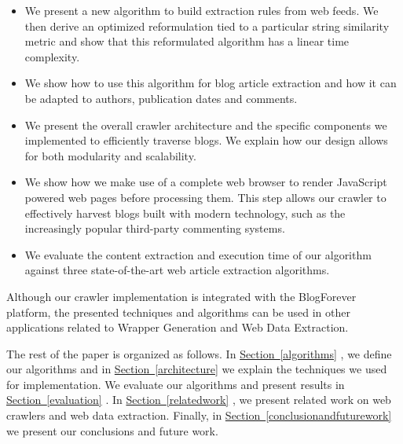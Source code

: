 \begin{itemize}
  \item We present a new algorithm to build extraction rules from web feeds. We then derive an optimized reformulation tied to a particular string similarity metric and show that this reformulated algorithm has a linear time complexity.
  \item We show how to use this algorithm for blog article extraction and how it can be adapted to authors, publication dates and comments.
  \item We present the overall crawler architecture and the specific components we implemented to efficiently traverse blogs. We explain how our design allows for both modularity and scalability.
  \item We show how we make use of a complete web browser to render JavaScript powered web pages before processing them. This step allows our crawler to effectively harvest blogs built with modern technology, such as the increasingly popular third-party commenting systems.
  \item We evaluate the content extraction and execution time of our algorithm against three state-of-the-art web article extraction algorithms.
\end{itemize}
  

Although our crawler implementation is integrated with the BlogForever platform, the presented techniques and algorithms can be used in other applications related to Wrapper Generation and Web Data Extraction.

The rest of the paper is organized as follows. In \hyperref[algorithms]{Section~\ref*{algorithms}}  , we define our algorithms and in \hyperref[techniques]{Section~\ref*{architecture}}   we explain the techniques we used for implementation. We evaluate our algorithms and present results in \hyperref[evaluation]{Section~\ref*{evaluation}} . In \hyperref[relatedwork]{Section~\ref*{relatedwork}}  , we present related work on web crawlers and web data extraction. Finally, in \hyperref[conclusionandfuturework]{Section~\ref*{conclusionandfuturework}}  we present our conclusions and future work.
